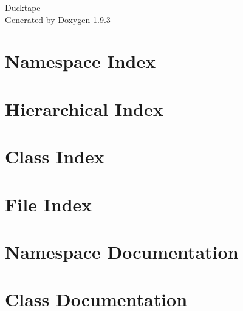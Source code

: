 \documentclass[twoside]{book}
\newcommand{\+}{\discretionary{\mbox{\scriptsize$\hookleftarrow$}}{}{}}
\newcommand{\clearemptydoublepage}{%
    \newpage{\pagestyle{empty}\cleardoublepage}%
  }
\begin{document}
  \raggedbottom
    \hypersetup{pageanchor=false,
                bookmarksnumbered=true,
                pdfencoding=unicode
               }
  \begin{titlepage}
  \vspace*{7cm}
  \begin{center}%
  {\Large Ducktape}\\
  \vspace*{1cm}
  {\large Generated by Doxygen 1.9.3}\\
  \end{center}
  \end{titlepage}
  \clearemptydoublepage
  \tableofcontents
  \clearemptydoublepage
  \hypersetup{pageanchor=true}
\chapter{Namespace Index}

\chapter{Hierarchical Index}

\chapter{Class Index}

\chapter{File Index}

\chapter{Namespace Documentation}












\chapter{Class Documentation}



















\end{document}
